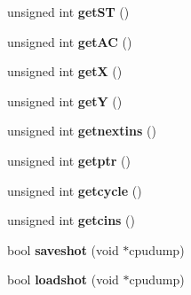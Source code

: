 \begin{DoxyCompactItemize}
unsigned int {\bfseries get\+ST} ()
\item 
\mbox{\label{class_c_p_u_ac818a75297688758a1cb5e04d25347a7}} 
unsigned int {\bfseries get\+AC} ()
\item 
\mbox{\label{class_c_p_u_a5684644390c2e10d3ec1361c1b5fa866}} 
unsigned int {\bfseries getX} ()
\item 
\mbox{\label{class_c_p_u_a760937b793b25b2b70e3349a1e0da03c}} 
unsigned int {\bfseries getY} ()
\item 
\mbox{\label{class_c_p_u_ae4e464d65a2fd2f7cd289ed4b8e5f979}} 
unsigned int {\bfseries getnextins} ()
\item 
\mbox{\label{class_c_p_u_ab248d8c08a65fdef15ac179c74e301b0}} 
unsigned int {\bfseries getptr} ()
\item 
\mbox{\label{class_c_p_u_a959f25bde678be3feb53d8e0bf737f41}} 
unsigned int {\bfseries getcycle} ()
\item 
\mbox{\label{class_c_p_u_aca496d86cc939db82cf3d8ffd0e4d62c}} 
unsigned int {\bfseries getcins} ()
\item 
\mbox{\label{class_c_p_u_ae14fe5dfb1f2f0e2e459e51b8dd8de85}} 
bool {\bfseries saveshot} (void $\ast$cpudump)
\item 
\mbox{\label{class_c_p_u_ab8e10efe14836a01b18dc6fed89de5d7}} 
bool {\bfseries loadshot} (void $\ast$cpudump)
\end{DoxyCompactItemize}
